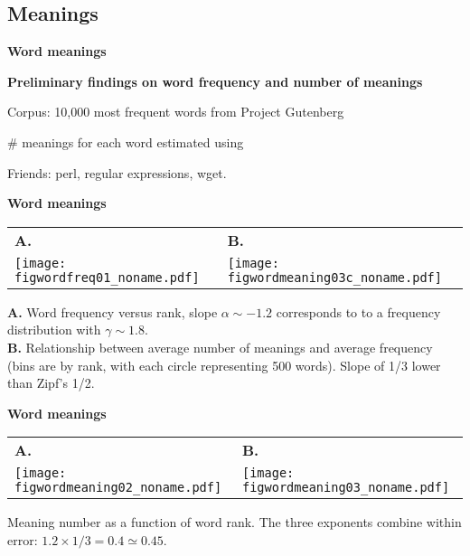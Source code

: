 \begin{frame}[plain]
\section{Meanings}

  \textbf{Word meanings}

  \textbf{Preliminary findings on word frequency and number of meanings}
    
     
      Corpus: 10,000 most frequent words from Project Gutenberg
     
      \# meanings for each word estimated using 
     
      Friends: perl, regular expressions, wget.
    
  


  \textbf{Word meanings}

  
    \begin{tabular}{ll}
      \textbf{A.} & 
      \textbf{B.} \\
      \texttt{[image: figwordfreq01\_noname.pdf]} & 
      \texttt{[image: figwordmeaning03c\_noname.pdf]}
    \end{tabular}

    \textbf{A.} 
    Word frequency versus rank, 
    slope $\alpha \sim -1.2$ corresponds to
    to a frequency distribution with $\gamma \sim 1.8$.\\
    \textbf{B.} 
    Relationship between average number of meanings and 
    average frequency (bins are by rank, with
    each circle representing 500 words).  Slope of 1/3 lower than
    Zipf's 1/2\cite{zipf1949a}.
  



  \textbf{Word meanings}

  
    \begin{tabular}{ll}
      \textbf{A.} & 
      \textbf{B.} \\
      \texttt{[image: figwordmeaning02\_noname.pdf]} &
      \texttt{[image: figwordmeaning03\_noname.pdf]} \\
    \end{tabular}
    
     Meaning number as a function of word rank.
     The three exponents combine within error:
      $ 1.2 \times 1/3 = 0.4 \simeq 0.45.$
    
  




\end{frame}
